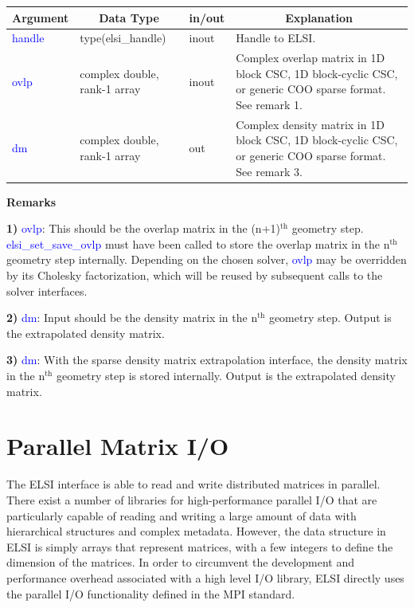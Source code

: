 \documentclass{report}
\newcommand{\tcb}[1]{\textcolor{blue}{#1}}
\begin{document}
\begin{tabular}[]{|p{20mm}|p{45mm}|p{15mm}|p{85mm}|}
\hline
\multicolumn{1}{|c|}{\textbf{Argument}} & \multicolumn{1}{c|}{\textbf{Data Type}} & \multicolumn{1}{c|}{\textbf{in/out}} & \multicolumn{1}{c|}{\textbf{Explanation}}\\
\hline
\tcb{handle} & type(elsi\_handle)           & inout & Handle to ELSI.\\
\hline
\tcb{ovlp}   & complex double, rank-1 array & inout & Complex overlap matrix in 1D block CSC, 1D block-cyclic CSC, or generic COO sparse format. See remark 1.\\
\hline
\tcb{dm}     & complex double, rank-1 array & out   & Complex density matrix in 1D block CSC, 1D block-cyclic CSC, or generic COO sparse format. See remark 3.\\
\hline
\end{tabular}

\textbf{Remarks}

\textbf{1)} \tcb{ovlp}: This should be the overlap matrix in the (n+1)$^\text{th}$ geometry step. \tcb{elsi\_set\_save\_ovlp} must have been called to store the overlap matrix in the n$^\text{th}$ geometry step internally. Depending on the chosen solver, \tcb{ovlp} may be overridden by its Cholesky factorization, which will be reused by subsequent calls to the solver interfaces.

\textbf{2)} \tcb{dm}: Input should be the density matrix in the n$^\text{th}$ geometry step. Output is the extrapolated density matrix.

\textbf{3)} \tcb{dm}: With the sparse density matrix extrapolation interface, the density matrix in the n$^\text{th}$ geometry step is stored internally. Output is the extrapolated density matrix.

\section{Parallel Matrix I/O}
\label{sec:rw}
The ELSI interface is able to read and write distributed matrices in parallel. There exist a number of libraries for high-performance parallel I/O that are particularly capable of reading and writing a large amount of data with hierarchical structures and complex metadata. However, the data structure in ELSI is simply arrays that represent matrices, with a few integers to define the dimension of the matrices. In order to circumvent the development and performance overhead associated with a high level I/O library, ELSI directly uses the parallel I/O functionality defined in the MPI standard.
\end{document}
